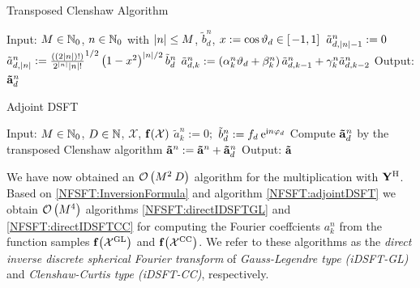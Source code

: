 \begin{algorithm}[htb]
  \caption{Transposed Clenshaw Algorithm}
  \label{NFSFT:transposedClenshaw}    
  \begin{algorithmic}
    \STATE  Input: $M \in \mathbb{N}_{0}$, $n \in \mathbb{N}_{0}$ with $\left\vert n\right\vert \le M$, $\tilde{b}^n_{d}$, $x := \cos\vartheta_{d} \in \left[\left.-1,1\right]\right.$
    \STATE
    \STATE $\tilde{a}_{d,\left\vert n\right\vert-1}^n := 0$
    \STATE $\tilde{a}_{d,\left\vert n\right\vert}^n := \frac{((2|n|)!)}{2^{|n|} |n|!}^{1/2} \left(1-x^2\right)^{|n|/2} \tilde{b}^n_{d}$
      \STATE $\tilde{a}_{d,k}^n := \left(\alpha_{k}^n\vartheta_{d} + \beta_{k}^n\right)\tilde{a}_{d,k-1}^n + \gamma_{k}^n \tilde{a}_{d,k-2}^n$
    \ENDFOR
    \STATE
    \STATE Output: $\mathbf{\tilde{a}}^n_{d}$
\end{algorithmic}
\end{algorithm}
\begin{algorithm}[htb]
  \caption{Adjoint DSFT}
  \label{NFSFT:adjointDSFT}    
  \begin{algorithmic}
    \STATE  Input: $M \in \mathbb{N}_{0}$, $D \in \mathbb{N}$, $\mathcal{X}$, $\mathbf{f}{\hspace{-0.4ex}}\left(\mathcal{X}\right)$
    \STATE
        \STATE $\tilde{a}_{k}^n := 0;$
      \ENDFOR
    \ENDFOR
        \STATE $\tilde{b}^n_{d} := f_{d} \: \mbox{\rm{e}}^{\mbox{\scriptsize\rm{i}} n \varphi_{d}}$
        \STATE Compute $\mathbf{\tilde{a}}^n_{d}$ by the transposed Clenshaw algorithm
        \STATE $\mathbf{\tilde{a}}^n := \mathbf{\tilde{a}}^n + \mathbf{\tilde{a}}^n_{d}$
      \ENDFOR
    \ENDFOR
    \STATE
    \STATE Output: $\mathbf{\tilde{a}}$
\end{algorithmic}
\end{algorithm}

We have now obtained an $\mathcal{O}\left(M^2\:D\right)$ algorithm for the multiplication with $\mathbf{Y}^{\text{\rm{H}}}$. Based on \ref{NFSFT:InversionFormula} and algorithm \ref{NFSFT:adjointDSFT} we obtain $\mathcal{O}\left(M^4\right)$ algorithms \ref{NFSFT:directIDSFTGL} and \ref{NFSFT:directIDSFTCC} for computing the Fourier coeffcients $a_{k}^n$ from the function samples $\mathbf{f}{\hspace{-0.4ex}}\left(\mathcal{X}^{\mbox{\scriptsize\rm{GL}}}\right)$ and $\mathbf{f}{\hspace{-0.4ex}}\left(\mathcal{X}^{\mbox{\scriptsize\rm{CC}}}\right)$. We refer to these algorithms as the \emph{direct inverse discrete spherical Fourier transform} of \emph{Gauss-Legendre type (iDSFT-GL)} and \emph{Clenshaw-Curtis type (iDSFT-CC)}, respectively.

